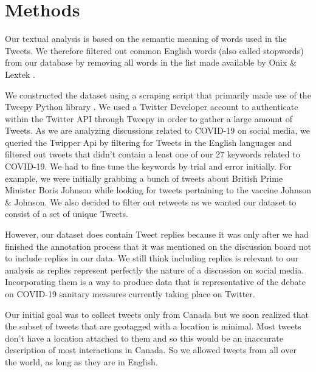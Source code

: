 \documentclass[letterpaper]{article} %
\begin{document}
\section{Methods}


Our textual analysis is based on the semantic meaning of words used in the Tweets. We therefore filtered out common English words (also called stopwords) from our database by removing all words in the list made available by Onix \& Lextek \cite{BrigadirRepo}. 


We constructed the dataset using a scraping script that primarily made use of
the Tweepy Python library \cite{roesslein2020tweepy}. We used a Twitter
Developer account to authenticate within the Twitter API through Tweepy in order
to gather a large amount of Tweets. As we are analyzing discussions related to
COVID-19 on social media, we queried the Twipper Api by filtering for Tweets in
the English languages and filtered out tweets that didn't contain a least one of
our 27 keywords related to COVID-19. We had to fine tune
the keywords by trial and error initially. For example, we were initially
grabbing a bunch of tweets about British Prime Minister Boris Johnson while
looking for tweets pertaining to the vaccine Johnson \& Johnson.
We also decided to filter out retweets as
we wanted our dataset to consist of a set of unique Tweets. 

However, our dataset does contain Tweet replies because it was only after we had
finished the annotation process that it was mentioned on the discussion board
not to include replies in our data. We still think including replies is relevant
to our analysis as replies represent perfectly the nature of a discussion on
social media. Incorporating them is a way to produce data that is representative
of the debate on COVID-19 sanitary measures currently taking place on Twitter.

Our initial goal was to collect tweets only from Canada but we soon realized
that the subset of tweets that are geotagged with a location is minimal. Most
tweets don't have a location attached to them and so this would be an inaccurate
description of most interactions in Canada. So we allowed tweets from all over
the world, as long as they are in English.
\end{document}
